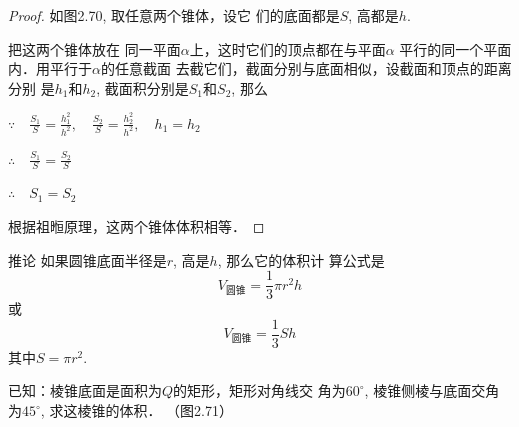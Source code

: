 \begin{proof}
如图2.70, 取任意两个锥体，设它
们的底面都是$S$, 高都是$h$.

把这两个锥体放在
同一平面$\alpha$上，这时它们的顶点都在与平面$\alpha$
平行的同一个平面内．用平行于$\alpha$的任意截面
去截它们，截面分别与底面相似，设截面和顶点的距离分别
是$h_1$和$h_2$, 截面积分别是$S_1$和$S_2$, 那么

$\because\quad \frac{S_1}{S}=\frac{h^2_1}{h^2},\quad \frac{S_2}{S}=\frac{h^2_2}{h^2},\quad h_1=h_2$

$\therefore\quad \frac{S_1}{S}=\frac{S_2}{S}$

$\therefore\quad S_1=S_2$

根据祖暅原理，这两个锥体体积相等．
\end{proof}

\begin{blk}
    {推论} 如果圆锥底面半径是$r$, 高是$h$, 那么它的体积计
算公式是
\[V_{\text{圆锥}}=\frac{1}{3}\pi r^2 h\]
或
\[V_{\text{圆锥}}=\frac{1}{3}S h\]
其中$S=\pi r^2$.
\end{blk}




























\begin{example}
    已知：棱锥底面是面积为$Q$的矩形，矩形对角线交
角为$60^{\circ}$, 棱锥侧棱与底面交角为$45^{\circ}$, 求这棱锥的体积．
（图2.71）
\end{example}

\begin{figure}[htp]
    \centering
{}
    \caption{}
\end{figure}

